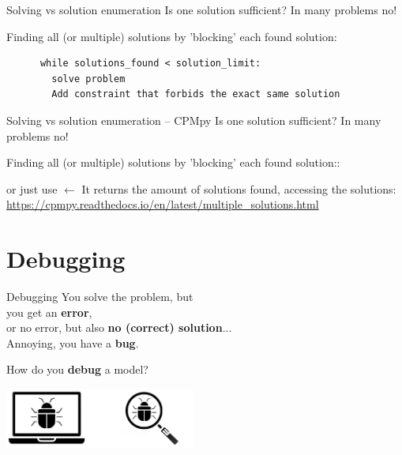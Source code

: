 \documentclass{cons-beamer}
\begin{document}
\begin{frame}[fragile]{Solving vs solution enumeration}  %
  Is one solution sufficient? In many problems no!
  \vfill

  Finding all (or multiple) solutions by 'blocking' each found solution:

  \begin{verbatim}
      while solutions_found < solution_limit:
        solve problem
        Add constraint that forbids the exact same solution
  \end{verbatim}
\end{frame}

\begin{flashcardcpmpy}
\begin{frame}{Solving vs solution enumeration -- CPMpy}
  Is one solution sufficient? In many problems no!
  \vfill

  Finding all (or multiple) solutions by 'blocking' each found solution::
  \vfill

  \footnotesize
  
  \normalsize
  \vfill

  or just use  $\xleftarrow{}$ It returns the amount of solutions found, accessing the solutions:  \footnotesize\url{https://cpmpy.readthedocs.io/en/latest/multiple_solutions.html}
\end{frame}
\end{flashcardcpmpy}


\section{Debugging}

\begin{frame}{Debugging}
  You solve the problem, but \\
  you get an \textbf{error}, \\
  or no error, but also \textbf{no (correct) solution}... \\
  Annoying, you have a \textbf{bug}.
  \vfill

  \Large	
  How do you \textbf{debug} a model?

  \begin{center}
    \includegraphics[height=20mm]{images/texpl_img/debug.jpg}
  \end{center}
\end{frame}
\end{document}
